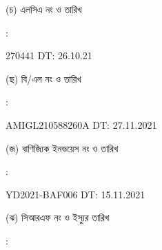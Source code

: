 \documentclass[12pt]{article}
\newcommand{\lcdt}{26.10.21}
\newcommand{\lcano}{270441}
\newcommand{\lcadt}{{\lcdt}}
\newcommand{\invno}{YD2021-BAF006}
\newcommand{\invdt}{15.11.2021}
\newcommand{\blno}{AMIGL210588260A}
\newcommand{\bldt}{27.11.2021}
\begin{document}
\begin{minipage}[t]{0.05\linewidth}
\hspace*{1em}
\end{minipage}
\begin{minipage}[t]{0.40\linewidth}
(চ) এলসিএ নং ও তারিখ
\end{minipage}
\begin{minipage}[t]{0.02\linewidth}
:
\end{minipage}
\begin{minipage}[t]{0.53\linewidth}
{\lcano} \hspace{2em} DT: {\lcadt}
\\
\end{minipage}
\begin{minipage}[t]{0.05\linewidth}
\hspace*{1em}
\end{minipage}
\begin{minipage}[t]{0.40\linewidth}
(ছ) বি/এল নং ও তারিখ
\end{minipage}
\begin{minipage}[t]{0.02\linewidth}
:
\end{minipage}
\begin{minipage}[t]{0.53\linewidth}
{\blno} \hspace{2em} DT: {\bldt}
\\
\end{minipage}
\begin{minipage}[t]{0.05\linewidth}
\hspace*{1em}
\end{minipage}
\begin{minipage}[t]{0.40\linewidth}
(জ) বাণিজ্যিক ইনভয়েস নং ও তারিখ
\end{minipage}
\begin{minipage}[t]{0.02\linewidth}
:
\end{minipage}
\begin{minipage}[t]{0.53\linewidth}
{\invno} \hspace{2em} DT: {\invdt}
\\
\end{minipage}
\begin{minipage}[t]{0.05\linewidth}
\hspace*{1em}
\end{minipage}
\begin{minipage}[t]{0.40\linewidth}
(ঝ) সিআরএফ নং ও ইস্যুর তারিখ
\end{minipage}
\begin{minipage}[t]{0.02\linewidth}
:
\end{minipage}
\end{document}
